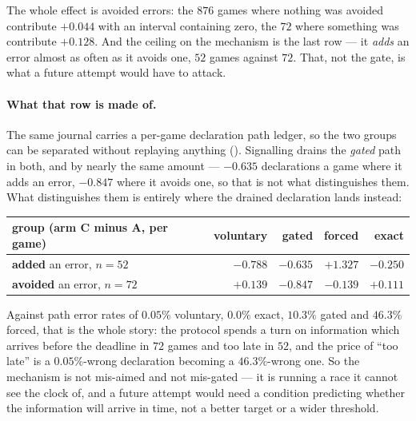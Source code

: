 \documentclass[11pt,letterpaper]{article}
\begin{document}
The whole effect is avoided errors: the $876$ games where nothing was avoided
contribute $+0.044$ with an interval containing zero, the $72$ where something
was contribute $+0.128$. And the ceiling on the mechanism is the last row ---
it \emph{adds} an error almost as often as it avoids one, $52$ games against
$72$. That, not the gate, is what a future attempt would have to attack.

\paragraph{What that row is made of.} The same journal carries a per-game
declaration path ledger, so the two groups can be separated without replaying
anything (). Signalling drains the
\emph{gated} path in both, and by nearly the same amount --- $-0.635$
declarations a game where it adds an error, $-0.847$ where it avoids one, so
that is not what distinguishes them. What distinguishes them is entirely where
the drained declaration lands instead:

\begin{center}
\small
\begin{tabular}{lrrrr}
\toprule
group (arm C minus A, per game) & voluntary & gated & forced & exact \\
\midrule
\textbf{added} an error, $n = 52$ & $-0.788$ & $-0.635$ & $\mathbf{+1.327}$ & $-0.250$ \\
\textbf{avoided} an error, $n = 72$ & $\mathbf{+0.139}$ & $-0.847$ & $-0.139$ & $+0.111$ \\
\bottomrule
\end{tabular}
\end{center}

\noindent Against path error rates of $0.05\%$ voluntary, $0.0\%$ exact,
$10.3\%$ gated and $46.3\%$ forced, that is the whole story: the protocol
spends a turn on information which arrives before the deadline in $72$ games
and too late in $52$, and the price of ``too late'' is a $0.05\%$-wrong
declaration becoming a $46.3\%$-wrong one. So the mechanism is not mis-aimed
and not mis-gated --- it is running a race it cannot see the clock of, and a
future attempt would need a condition predicting whether the information will
arrive in time, not a better target or a wider threshold.
\end{document}
